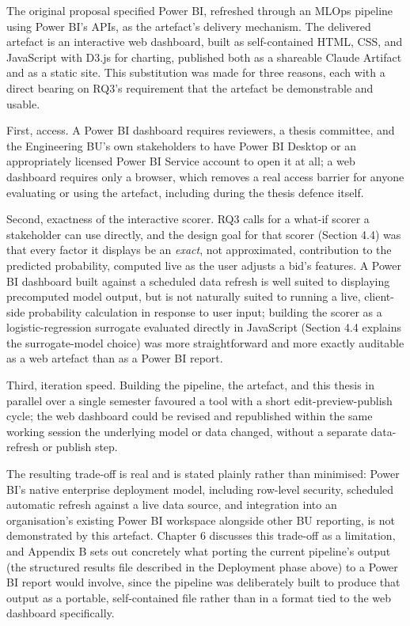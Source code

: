 \documentclass[12pt,oneside]{report}
\begin{document}
The original proposal specified Power BI, refreshed through an MLOps
pipeline using Power BI's APIs, as the artefact's delivery mechanism.
The delivered artefact is an interactive web dashboard, built as
self-contained HTML, CSS, and JavaScript with D3.js for charting,
published both as a shareable Claude Artifact and as a static site. This
substitution was made for three reasons, each with a direct bearing on
RQ3's requirement that the artefact be demonstrable and usable.

First, access. A Power BI dashboard requires reviewers, a thesis
committee, and the Engineering BU's own stakeholders to have Power BI
Desktop or an appropriately licensed Power BI Service account to open it
at all; a web dashboard requires only a browser, which removes a real
access barrier for anyone evaluating or using the artefact, including
during the thesis defence itself.

Second, exactness of the interactive scorer. RQ3 calls for a what-if
scorer a stakeholder can use directly, and the design goal for that
scorer (Section 4.4) was that every factor it displays be an
\emph{exact}, not approximated, contribution to the predicted
probability, computed live as the user adjusts a bid's features. A Power
BI dashboard built against a scheduled data refresh is well suited to
displaying precomputed model output, but is not naturally suited to
running a live, client-side probability calculation in response to user
input; building the scorer as a logistic-regression surrogate evaluated
directly in JavaScript (Section 4.4 explains the surrogate-model choice)
was more straightforward and more exactly auditable as a web artefact
than as a Power BI report.

Third, iteration speed. Building the pipeline, the artefact, and this
thesis in parallel over a single semester favoured a tool with a short
edit-preview-publish cycle; the web dashboard could be revised and
republished within the same working session the underlying model or data
changed, without a separate data-refresh or publish step.

The resulting trade-off is real and is stated plainly rather than
minimised: Power BI's native enterprise deployment model, including
row-level security, scheduled automatic refresh against a live data
source, and integration into an organisation's existing Power BI
workspace alongside other BU reporting, is not demonstrated by this
artefact. Chapter 6 discusses this trade-off as a limitation, and
Appendix B sets out concretely what porting the current pipeline's
output (the structured results file described in the Deployment phase
above) to a Power BI report would involve, since the pipeline was
deliberately built to produce that output as a portable, self-contained
file rather than in a format tied to the web dashboard specifically.
\end{document}
